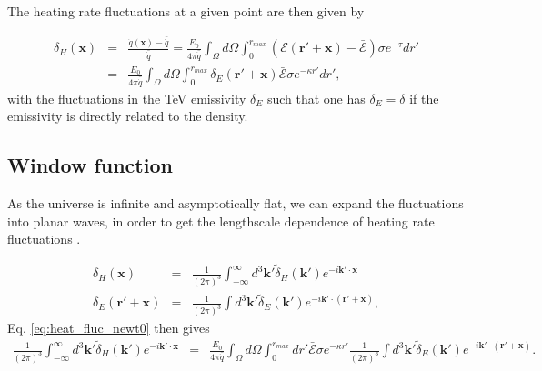 \documentclass[twocolumns]{emulateapj}
\begin{document}
The heating rate fluctuations at a given point are then given by 

\begin{eqnarray}
  \label{eq:heat_fluc_newt0}
  \delta_H(\mathbf{x})&=&\frac{\dot{q}(\mathbf{x})-\bar{\dot{q}}}{\bar{\dot{q}}}=\frac{E_0}{4\pi\bar{\dot{q}}} \int_{\Omega}d\Omega\int_0^{r_{max}}   (\mathcal{E}(\mathbf{r}'+\mathbf{x})-\bar{\mathcal{E}}) \sigma  e^{-\tau} dr' \\ \nonumber
  &=&\frac{E_0}{4\pi\bar{\dot{q}}}\int_{\Omega}d\Omega\int_0^{r_{max}}   \delta_E(\mathbf{r}'+\mathbf{x})\bar{\mathcal{E}}\sigma  e^{-\kappa r'}dr',
\end{eqnarray}
with the fluctuations in the TeV emissivity $\delta_E$ such that one has $\delta_E=\delta$ if the emissivity is directly related to the density.



\subsection{Window function}
As the universe is infinite and asymptotically flat, we can expand the fluctuations into planar waves, in order to get the lengthscale dependence of heating rate fluctuations \citep{2004MNRAS.352..142B}.

\begin{eqnarray}
  \label{eq:FT_delta}
  \delta_H(\mathbf{x})&=&\frac{1}{(2\pi)^3}\int_{-\infty}^{\infty} d^3\mathbf{k'} \tilde{\delta}_H(\mathbf{k'}) e^{-i\mathbf{k'}\cdot\mathbf{x}}\\ \nonumber
  \delta_E(\mathbf{r}'+\mathbf{x})&=&\frac{1}{(2\pi)^3}\int d^3\mathbf{k'} \tilde{\delta}_E(\mathbf{k'}) e^{-i\mathbf{k'}\cdot(\mathbf{r'}+\mathbf{x})},
\end{eqnarray}
Eq. \ref{eq:heat_fluc_newt0} then gives
\begin{eqnarray}
  \label{eq:heat_fluc_newt1}
\frac{1}{(2\pi)^3}\int_{-\infty}^{\infty} d^3\mathbf{k'} \tilde{\delta}_H(\mathbf{k'}) e^{-i\mathbf{k'}\cdot\mathbf{x}}&=&\frac{E_0}{4\pi\bar{\dot{q}}} \int_{\Omega}d\Omega\int_0^{r_{max}}  dr' \bar{\mathcal{E}}\sigma  e^{-\kappa r'}  \frac{1}{(2\pi)^3}\int d^3\mathbf{k'} \tilde{\delta}_E(\mathbf{k'}) e^{-i\mathbf{k'}\cdot(\mathbf{r'}+\mathbf{x})}.
\end{eqnarray}
\end{document}
